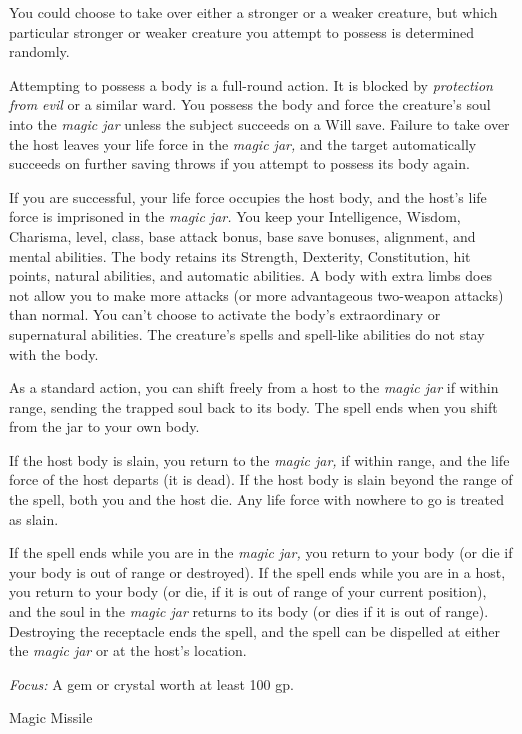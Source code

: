 \documentclass{article}
\begin{document}
You could choose to take over either a stronger or a weaker creature, but which 
particular stronger or weaker creature you attempt to possess is determined randomly.

Attempting to possess a body is a full-round action. It is blocked by \textit{protection 
from evil }or a similar ward. You possess the body and force the creature's soul 
into the \textit{magic jar }unless the subject succeeds on a Will save. Failure 
to take over the host leaves your life force in the \textit{magic jar, }and the 
target automatically succeeds on further saving throws if you attempt to possess 
its body again.

If you are successful, your life force occupies the host body, and the host's life 
force is imprisoned in the \textit{magic jar. }You keep your Intelligence, Wisdom, 
Charisma, level, class, base attack bonus, base save bonuses, alignment, and mental 
abilities. The body retains its Strength, Dexterity, Constitution, hit points, 
natural abilities, and automatic abilities. A body with extra limbs does not allow 
you to make more attacks (or more advantageous two-weapon attacks) than normal. 
You can't choose to activate the body's extraordinary or supernatural abilities. 
The creature's spells and spell-like abilities do not stay with the body.

As a standard action, you can shift freely from a host to the \textit{magic jar 
}if within range, sending the trapped soul back to its body. The spell ends when 
you shift from the jar to your own body.

If the host body is slain, you return to the \textit{magic jar, }if within range, 
and the life force of the host departs (it is dead). If the host body is slain 
beyond the range of the spell, both you and the host die. Any life force with nowhere 
to go is treated as slain.

If the spell ends while you are in the \textit{magic jar, }you return to your body 
(or die if your body is out of range or destroyed). If the spell ends while you 
are in a host, you return to your body (or die, if it is out of range of your current 
position), and the soul in the \textit{magic jar }returns to its body (or dies 
if it is out of range). Destroying the receptacle ends the spell, and the spell 
can be dispelled at either the \textit{magic jar }or at the host's location.

\textit{Focus: }A gem or crystal worth at least 100 gp.

\vspace{12pt}
Magic Missile
\end{document}
